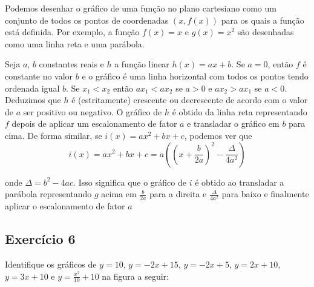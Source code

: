 Podemos desenhar o gráfico de uma função no plano cartesiano como um conjunto de
todos os pontos de coordenadas $(x, f(x))$ para os quais a função está definida.
Por exemplo, a função $f(x) = x$ e $g(x) = x^2$ são desenhadas como uma linha
reta e uma parábola.

\begin{center}
\end{center}

Seja $a$, $b$ constantes reais e $h$ a função linear $h(x) = ax + b$.
Se $a = 0$, então $f$ é constante no valor $b$ e o gráfico é uma linha
horizontal com todos os pontos tendo ordenada igual $b$.
Se $x_1 < x_2$ então $ax_1 < ax_2$ se $a > 0$ e $ax_2 > ax_1$ se $a < 0$.
Deduzimos que $h$ é (estritamente) crescente ou decrescente de acordo com o
valor de $a$ ser positivo ou negativo. O gráfico de $h$ é obtido da linha reta
representando $f$ depois de aplicar um escalonamento de fator $a$ e transladar o
gráfico em $b$ para cima. De forma similar,
se $i(x) = ax^2 + bx + c$, podemos ver que
$$i(x) = a x^2 + b x + c =
a \left( \left(x + \frac{b}{2a}\right)^2 - \frac{\Delta}{4a^2} \right)$$

onde $\Delta = b^2 - 4ac$. Isso significa que o gráfico de $i$ é obtido ao
transladar a parábola representando $g$ acima em $\frac{b}{2a}$ para a direita e
$\frac{\Delta}{4a^2}$ para baixo e finalmente aplicar o escalonamento de fator $a$

\subsection*{Exercício 6}

Identifique os gráficos de
$y = 10$,
$y=-2x+15$,
$y=-2x+5$,
$y=2x+10$,
$y=3x+10$ e
$y=\frac{x^2}{10} + 10$
na figura a seguir:

\begin{center}
\end{center}

